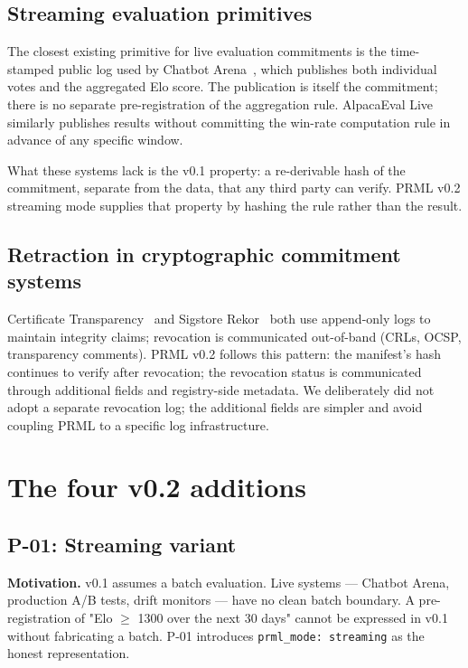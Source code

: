 \documentclass[11pt, a4paper]{article}
\begin{document}
\subsection{Streaming evaluation primitives}

The closest existing primitive for live evaluation commitments is the time-stamped public log used by Chatbot Arena~\cite{chatbot-arena-2024}, which publishes both individual votes and the aggregated Elo score. The publication is itself the commitment; there is no separate pre-registration of the aggregation rule. AlpacaEval Live~\cite{alpaca-eval-2024} similarly publishes results without committing the win-rate computation rule in advance of any specific window.

What these systems lack is the v0.1 property: a re-derivable hash of the commitment, separate from the data, that any third party can verify. PRML v0.2 streaming mode supplies that property by hashing the rule rather than the result.

\subsection{Retraction in cryptographic commitment systems}

Certificate Transparency~\cite{ct-2013} and Sigstore Rekor~\cite{rekor-2021} both use append-only logs to maintain integrity claims; revocation is communicated out-of-band (CRLs, OCSP, transparency comments). PRML v0.2 follows this pattern: the manifest's hash continues to verify after revocation; the revocation status is communicated through additional fields and registry-side metadata. We deliberately did not adopt a separate revocation log; the additional fields are simpler and avoid coupling PRML to a specific log infrastructure.

\section{The four v0.2 additions}
\label{sec:additions}


\subsection{P-01: Streaming variant}
\label{sec:p01}

\textbf{Motivation.} v0.1 assumes a batch evaluation. Live systems --- Chatbot Arena, production A/B tests, drift monitors --- have no clean batch boundary. A pre-registration of "Elo $\geq$ 1300 over the next 30 days" cannot be expressed in v0.1 without fabricating a batch. P-01 introduces \texttt{prml\_mode: streaming} as the honest representation.
\end{document}
